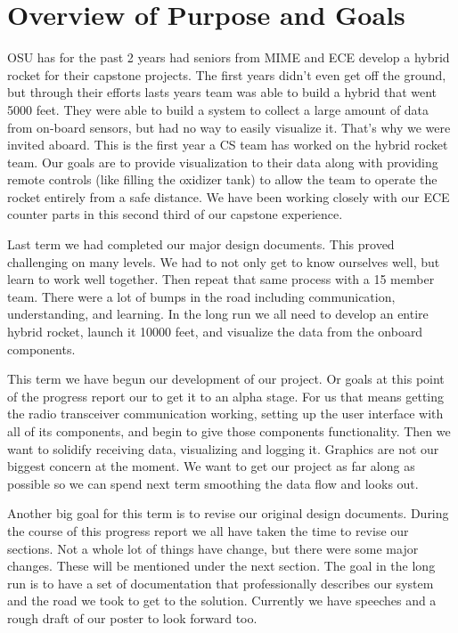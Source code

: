 \documentclass[10pt,draftclsnofoot,onecolumn]{IEEEtran}
\begin{document}
\section{Overview of Purpose and Goals}
OSU has for the past 2 years had seniors from MIME and ECE develop a hybrid rocket for their capstone projects. The first years didn't even get off the ground, but through their efforts lasts years team was able to build a hybrid that went 5000 feet. They were able to build a system to collect a large amount of data from on-board sensors, but had no way to easily visualize it. That's why we were invited aboard. This is the first year a CS team has worked on the hybrid rocket team. Our goals are to provide visualization to their data along with providing remote controls (like filling the oxidizer tank) to allow the team to operate the rocket entirely from a safe distance. We have been working closely with our ECE counter parts in this second third of our capstone experience. \par
Last term we had completed our major design documents. This proved challenging on many levels. We had to not only get to know ourselves well, but learn to work well together. Then repeat that same process with a 15 member team. There were a lot of bumps in the road including communication, understanding, and learning. In the long run we all need to develop an entire hybrid rocket, launch it 10000 feet, and visualize the data from the onboard components. \par
This term we have begun our development of our project. Or goals at this point of the progress report our to get it to an alpha stage. For us that means getting the radio transceiver communication working, setting up the user interface with all of its components, and begin to give those components functionality. Then we want to solidify receiving data, visualizing and logging it. Graphics are not our biggest concern at the moment. We want to get our project as far along as possible so we can spend next term smoothing the data flow and looks out. \par
Another big goal for this term is to revise our original design documents. During the course of this progress report we all have taken the time to revise our sections. Not a whole lot of things have change, but there were some major changes. These will be mentioned under the next section. The goal in the long run is to have a set of documentation that professionally describes our system and the road we took to get to the solution. Currently we have speeches and a rough draft of our poster to look forward too. \par
\end{document}
